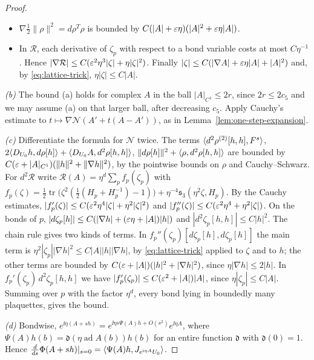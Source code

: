 \begin{proof}
\begin{itemize}
\item $\nabla\frac12\|\rho\|^2=d\rho^T\rho$ is bounded by $C(|A|+\varepsilon\eta)(|A|^2+\varepsilon\eta|A|)$.
\item In $\mathcal R$, each derivative of $\zeta_p$ with respect to a bond variable costs at most $C\eta^{-1}$. Hence $|\nabla\mathcal R|\le C(\varepsilon^2\eta^3|\zeta|+\eta|\zeta|^2)$. Finally $|\zeta|\le C(|\nabla A|+\varepsilon\eta|A|+|A|^2)$ and, by \eqref{eq:lattice-trick}, $\eta|\zeta|\le C|A|$.
\end{itemize}
\emph{(b)} The bound (a) holds for complex $A$ in the ball $|A|_{C^1}\le2r$, since $2r\le2c_5$ and we may assume (a) on that larger ball, after decreasing $c_5$. Apply Cauchy's estimate to $t\mapsto\nabla\mathcal N(A'+t(A-A'))$, as in Lemma~\ref{lem:one-step-expansion}.

\emph{(c)} Differentiate the formula for $\mathcal N$ twice. The terms $\langle d^2\rho^{(2)}[h,h],F^s\rangle$, $2\langle D_{U_0}h,d\rho[h]\rangle+\langle D_{U_0}A,d^2\rho[h,h]\rangle$, $\|d\rho[h]\|^2+\langle \rho,d^2\rho[h,h]\rangle$ are bounded by $C(\varepsilon+|A|_{C^1})(\|h\|^2+\|\nabla h\|^2)$, by the pointwise bounds on $\rho$ and Cauchy--Schwarz. For $d^2\mathcal R$ write $\mathcal R(A)=\eta^d\sum_pf_p(\zeta_p)$ with $f_p(\zeta)=\frac12\operatorname{tr}\big(\zeta^2(\frac12(H_p+H_p^{-1})-1)\big)+\eta^{-4}\mathfrak s_3(\eta^2\zeta,H_p)$. By the Cauchy estimates, $|f_p'(\zeta)|\le C(\varepsilon^2\eta^4|\zeta|+\eta^2|\zeta|^2)$ and $|f_p''(\zeta)|\le C(\varepsilon^2\eta^4+\eta^2|\zeta|)$. On the bonds of $p$, $|d\zeta_p[h]|\le C(|\nabla h|+(\varepsilon\eta+|A|)|h|)$ and $|d^2\zeta_p[h,h]|\le C|h|^2$. The chain rule gives two kinds of terms. In $f_p''(\zeta_p)[d\zeta_p[h],d\zeta_p[h]]$ the main term is $\eta^2|\zeta_p||\nabla h|^2\le C|A||h||\nabla h|$, by \eqref{eq:lattice-trick} applied to $\zeta$ and to $h$; the other terms are bounded by $C(\varepsilon+|A|)(|h|^2+|\nabla h|^2)$, since $\eta|\nabla h|\le2|h|$. In $f_p'(\zeta_p)\,d^2\zeta_p[h,h]$ we have $|f_p'(\zeta_p)|\le C(\varepsilon^2+|A|)|A|$, since $\eta|\zeta_p|\le C|A|$. Summing over $p$ with the factor $\eta^d$, every bond lying in boundedly many plaquettes, gives the bound.

\emph{(d)} Bondwise, $e^{\ii\eta(A+sh)}=e^{\ii\eta s\Psi(A)h+O(s^2)}e^{\ii\eta A}$, where $\Psi(A)h(b)=\mathfrak d(\eta\operatorname{ad}A(b))h(b)$ for an entire function $\mathfrak d$ with $\mathfrak d(0)=1$. Hence $\frac{d}{ds}\Phi(A+sh)|_{s=0}=\langle \Psi(A)h,J_{e^{\mathrm i\eta A}U_0}\rangle$.
\end{proof}
